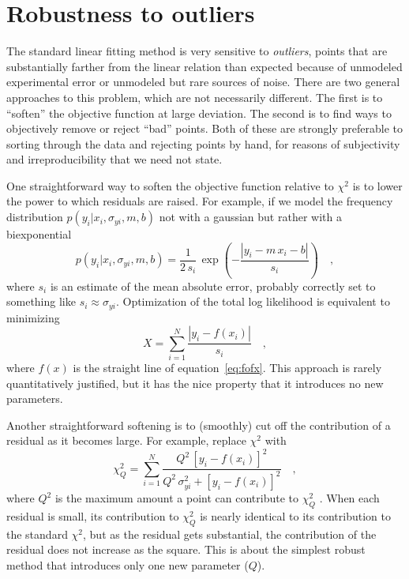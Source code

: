 \documentclass[12pt,twoside]{article}
\newcommand{\equationname}{equation}
\newcounter{problem}
\begin{document}
\section{Robustness to outliers}\label{sec:robust}

The standard linear fitting method is very sensitive to
\emph{outliers}, points that are substantially farther from the linear
relation than expected because of unmodeled experimental error or
unmodeled but rare sources of noise.  There are two general approaches
to this problem, which are not necessarily different.  The first is to
``soften'' the objective function at large deviation.  The second is
to find ways to objectively remove or reject ``bad'' points.  Both of
these are strongly preferable to sorting through the data and
rejecting points by hand, for reasons of subjectivity and
irreproducibility that we need not state.

One straightforward way to soften the objective function relative to
$\chi^2$ is to lower the power to which residuals are raised.  For
example, if we model the frequency distribution
$p(y_i|x_i,\sigma_{yi},m,b)$ not with a gaussian but rather with a
biexponential
\begin{equation}
p(y_i|x_i,\sigma_{yi},m,b) = \frac{1}{2\,s_i}
 \,\exp\left(-\frac{|y_i-m\,x_i-b|}{s_i}\right) \quad ,
\end{equation}
where $s_i$ is an estimate of the mean absolute error, probably
correctly set to something like $s_i\approx \sigma_{yi}$.
Optimization of the total log likelihood is equivalent to minimizing
\begin{equation}\label{eq:biexp}
X = \sum_{i=1}^N \frac{|y_i-f(x_i)|}{s_i} \quad ,
\end{equation}
where $f(x)$ is the straight line of \equationname~\ref{eq:fofx}.
This approach is rarely quantitatively justified, but it has the nice
property that it introduces no new parameters.

Another straightforward softening is to (smoothly) cut off the
contribution of a residual as it becomes large.  For example, replace
$\chi^2$ with
\begin{equation}\label{eq:soft}
\chi_Q^2 = \sum_{i=1}^N \frac{Q^2\,[y_i-f(x_i)]^2}
  {Q^2\,\sigma_{yi}^2+[y_i-f(x_i)]^2} \quad ,
\end{equation}
where $Q^2$ is the maximum amount a point can contribute to $\chi_Q^2$
 \citep{hampel}.  When each residual is small, its
contribution to $\chi_Q^2$ is nearly identical to its contribution to
the standard $\chi^2$, but as the residual gets substantial, the
contribution of the residual does not increase as the square.  This is
about the simplest robust method that introduces only one new
parameter ($Q$).
\end{document}
